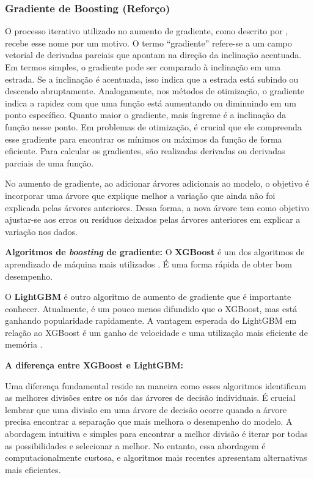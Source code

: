 \subsubsection{Gradiente de Boosting (Refor\c co)} \label{subsubsec:boosting}

O processo iterativo utilizado no aumento de gradiente, como descrito por , recebe esse nome por um motivo. O termo ``gradiente'' refere-se a um campo vetorial de derivadas parciais que apontam na direção da inclinação acentuada. Em termos simples, o gradiente pode ser comparado à inclinação em uma estrada. Se a inclinação é acentuada, isso indica que a estrada está subindo ou descendo abruptamente. Analogamente, nos métodos de otimização, o gradiente indica a rapidez com que uma função está aumentando ou diminuindo em um ponto específico. Quanto maior o gradiente, mais íngreme é a inclinação da função nesse ponto. Em problemas de otimização, é crucial que ele compreenda esse gradiente para encontrar os mínimos ou máximos da função de forma eficiente. Para calcular os gradientes, são realizadas derivadas ou derivadas parciais de uma função.

No aumento de gradiente, ao adicionar árvores adicionais ao modelo, o objetivo é incorporar uma árvore que explique melhor a variação que ainda não foi explicada pelas árvores anteriores. Dessa forma, a nova árvore tem como objetivo ajustar-se aos erros ou resíduos deixados pelas árvores anteriores em explicar a variação nos dados.

\noindent\textbf{Algoritmos de \textit{boosting} de gradiente:}
O \textbf{XGBoost} é um dos algoritmos de aprendizado de máquina mais utilizados \cite{korstanje2021}. É uma forma rápida de obter bom desempenho.

O \textbf{LightGBM} é outro algoritmo de aumento de gradiente que é importante conhecer. Atualmente, é um pouco menos difundido que o XGBoost, mas está ganhando popularidade rapidamente. A vantagem esperada do LightGBM em relação ao XGBoost é um ganho de velocidade e uma utilização mais eficiente de memória \cite{korstanje2021}.


\noindent\textbf{A diferen\c ca entre XGBoost e LightGBM:}

Uma diferença fundamental reside na maneira como esses algoritmos identificam as melhores divisões entre os nós das árvores de decisão individuais. É crucial lembrar que uma divisão em uma árvore de decisão ocorre quando a árvore precisa encontrar a separação que mais melhora o desempenho do modelo.
A abordagem intuitiva e simples para encontrar a melhor divisão é iterar por todas as possibilidades e selecionar a melhor. No entanto, essa abordagem é computacionalmente custosa, e algoritmos mais recentes apresentam alternativas mais eficientes.

